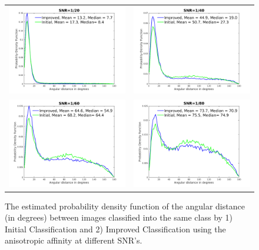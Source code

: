 \documentclass{article}
\begin{document}
\begin{figure}
\begin{center}
\begin{tabular}{cc}
\includegraphics[width=.49\columnwidth]{fighist_snr1by20.png} & \includegraphics[width=.49\columnwidth]{fighist_snr1by40.png} \\
\includegraphics[width=.49\columnwidth]{fighist_snr1by60.png} & \includegraphics[width=.49\columnwidth]{fighist_snr1by80.png}
\end{tabular}
\end{center}
\vspace{-.15in}
\caption{The estimated probability density function of the angular distance (in degrees) between images classified into the same class by 1) Initial Classification and 2) Improved Classification using the anisotropic affinity at different SNR's.}
\vspace{-.15in}
\label{fig:hist}
\end{figure}
\vspace{-.15in}
\end{document}
